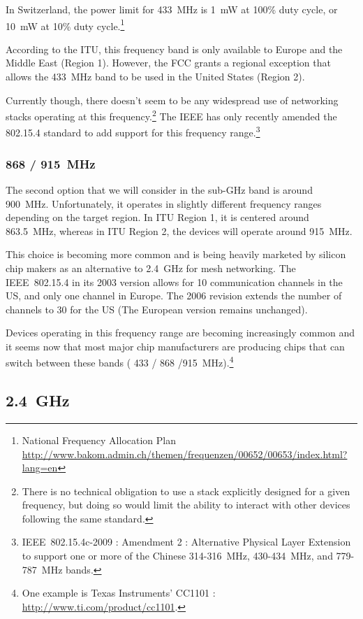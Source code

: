 In Switzerland, the power limit for \SI{433}{MHz} is \SI{1}{mW} at 100\% duty
cycle, or \SI{10}{mW} at 10\% duty cycle.\footnote{National Frequency Allocation Plan
\url{http://www.bakom.admin.ch/themen/frequenzen/00652/00653/index.html?lang=en}}

According to the ITU, this frequency band is only available to Europe and the
Middle East (Region 1). However, the FCC grants a regional exception that allows
the \SI{433}{MHz} band to be used in the United States (Region 2).

Currently though, there doesn't seem to be any widespread use of networking
stacks operating at this frequency.\footnote{There is no technical obligation to
use a stack explicitly designed for a given frequency, but doing so would limit
the ability to interact with other devices following the same standard.} The
IEEE has only recently amended the 802.15.4 standard to add support for this
frequency range.\footnote{IEEE~802.15.4c\texttrademark{}-2009 : Amendment 2 :
Alternative Physical Layer Extension to support one or more of the Chinese
314-316~MHz, 430-434~MHz, and 779-787~MHz bands.}

\subsubsection{868 / \SI{915}{MHz}}

The second option that we will consider in the sub-GHz band is around
\SI{900}{MHz}. Unfortunately, it operates in slightly different frequency ranges
depending on the target region. In \ac{ITU} Region 1, it is centered around
\SI{863.5}{MHz}, whereas in ITU Region 2, the devices will operate around
\SI{915}{MHz}.

This choice is becoming more common and is being heavily marketed by silicon
chip makers as an alternative to \SI{2.4}{GHz} for mesh networking. The
IEEE~802.15.4 in its 2003 version allows for 10 communication channels in the
US, and only one channel in Europe. The 2006 revision extends the number of
channels to 30 for the US (The European version remains unchanged).

Devices operating in this frequency range are becoming increasingly common and
it seems now that most major chip manufacturers are producing chips that can
switch between these bands ( 433 / 868 /\SI{915}{MHz}).\footnote{One example is
Texas Instruments' CC1101 : \url{http://www.ti.com/product/cc1101}.}

\subsection{\SI{2.4}{GHz}}

